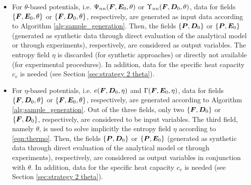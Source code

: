 \begin{itemize}
	\item For $\theta$-based potentials, i.e. $\Psi_{nn}(\boldsymbol{F},\boldsymbol{E}_0,\theta)$ or $\Upsilon_{nn}(\boldsymbol{F},\boldsymbol{D}_0,\theta)$, data for fields $\{\boldsymbol{F},\boldsymbol{E}_0,\theta\}$ or $\{\boldsymbol{F},\boldsymbol{D}_0,\theta\}$, respectively, are generated as input data according to Algorithm \ref{alg:sample_generation}. Then, the fields $\{\boldsymbol{P},\boldsymbol{D}_0\}$ or $\{\boldsymbol{P},\boldsymbol{E}_0\}$ (generated as synthetic data through direct evaluation of the analytical model or through experiments), respectively, are considered as output variables. The entropy field $\eta$ is discarded (for synthetic approaches) or directly not available (for experimental procedures). In addition, data for the specific heat capacity $c_v$ is needed (see Section \ref{sec:strategy 2 theta}).
	
	\item For $\eta$-based potentials, i.e. $e(\boldsymbol{F},\boldsymbol{D}_0,\eta)$ and $\Gamma(\boldsymbol{F},\boldsymbol{E}_0,\eta)$, data for fields $\{\boldsymbol{F},\boldsymbol{D}_0,\theta\}$ or $\{\boldsymbol{F},\boldsymbol{E}_0,\theta\}$, respectively, are generated according to Algorithm \ref{alg:sample_generation}.  Out of the three fields, only two $\{\boldsymbol{F},\boldsymbol{D}_0\}$ or $\{\boldsymbol{F},\boldsymbol{D}_0\}$, respectively, are considered to be input variables. The third field, namely $\theta$, is used to solve implicitly the entropy field $\eta$ according to \eqref{eqn:thermo}. Then, the fields  $\{\boldsymbol{P},\boldsymbol{D}_0\}$ or $\{\boldsymbol{P},\boldsymbol{E}_0\}$ (generated as synthetic data through direct evaluation of the analytical model or through experiments), respectively, are considered as output variables in conjunction with $\theta$. In addition, data for the specific heat capacity $c_v$ is needed (see Section \ref{sec:strategy 2 theta}).
\end{itemize} 



